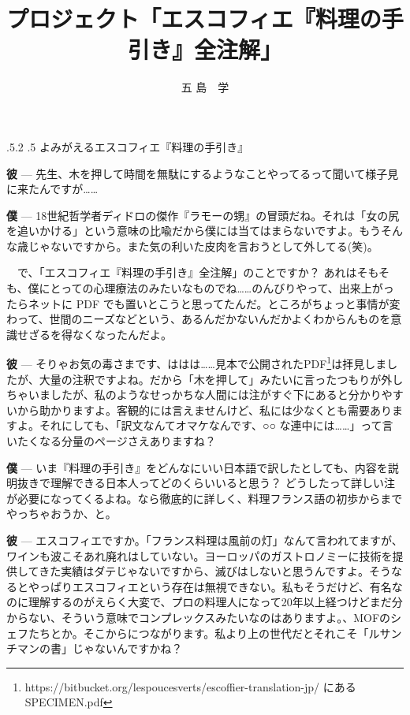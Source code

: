 \documentclass[14Q,]{ltjsbook}
\title{プロジェクト「エスコフィエ『料理の手引き』全注解」}
\author{五 島　学}
\date{}
\makeatletter
\renewcommand{\headfont}{\gtfamily\sffamily\bfseries}%
\renewcommand{\subsection}{\@startsection{subsection}{2}{\z@}%
    {\Cvs \@plus.5\Cdp \@minus.2\Cdp}%
    {.5\Cvs}
    {\normalfont\large\headfont\centering}} %
\renewcommand{\ldots}{\noindent…}
\let\footnotes@ve=\footnote
\def\footnote{\inhibitglue\footnotes@ve}
\makeatother
\begin{document}
\maketitle

\LARGE

\hypertarget{ressurection}{%
\subsection{よみがえるエスコフィエ『料理の手引き』}\label{ressurection}}

\textbf{彼} ---
先生、木を押して時間を無駄にするようなことやってるって聞いて様子見に来たんですが\ldots{}\ldots{}

\textbf{僕} ---
18世紀哲学者ディドロの傑作『ラモーの甥』の冒頭だね。それは「女の尻を追いかける」という意味の比喩だから僕には当てはまらないですよ。もうそんな歳じゃないですから。また気の利いた皮肉を言おうとして外してる(笑)。

　で、「エスコフィエ『料理の手引き』全注解」のことですか？
あれはそもそも、僕にとっての心理療法のみたいなものでね\ldots{}\ldots{}のんびりやって、出来上がったらネットに
PDF
でも置いとこうと思ってたんだ。ところがちょっと事情が変わって、世間のニーズなどという、あるんだかないんだかよくわからんものを意識せざるを得なくなったんだよ。

\textbf{彼} ---
そりゃお気の毒さまです、ははは\ldots{}\ldots{}見本で公開されたPDF\footnote{https://bitbucket.org/lespoucesverts/escoffier-translation-jp/
  にある SPECIMEN.pdf}は拝見しましたが、大量の注釈ですよね。だから「木を押して」みたいに言ったつもりが外しちゃいましたが、私のようなせっかちな人間には注がすぐ下にあると分かりやすいから助かりますよ。客観的には言えませんけど、私には少なくとも需要ありますよ。それにしても、「訳文なんてオマケなんです、○○
な連中には\ldots{}\ldots{}」って言いたくなる分量のページさえありますね？

\textbf{僕} ---
いま『料理の手引き』をどんなにいい日本語で訳したとしても、内容を説明抜きで理解できる日本人ってどのくらいいると思う？
どうしたって詳しい注が必要になってくるよね。なら徹底的に詳しく、料理フランス語の初歩からまでやっちゃおうか、と。

\textbf{彼} ---
エスコフィエですか。「フランス料理は風前の灯」なんて言われてますが、ワインも波こそあれ廃れはしていない。ヨーロッパのガストロノミーに技術を提供してきた実績はダテじゃないですから、滅びはしないと思うんですよ。そうなるとやっぱりエスコフィエという存在は無視できない。私もそうだけど、有名なのに理解するのがえらく大変で、プロの料理人になって20年以上経つけどまだ分からない、そういう意味でコンプレックスみたいなのはありますよ。、MOFのシェフたちとか。そこからにつながります。私より上の世代だとそれこそ「ルサンチマンの書」じゃないんですかね？
\end{document}
